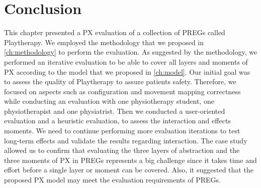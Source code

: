 \section{Conclusion}
This chapter presented a \ac{PX} evaluation of a collection of \acp{PREG} called Playtherapy. We employed the methodology that we proposed in \autoref{ch:methodology} to perform the evaluation. As suggested by the methodology, we performed an iterative evaluation to be able to cover all layers and moments of \ac{PX} according to the model that we proposed in \autoref{ch:model}. Our initial goal was to assess the quality of Playtherapy to assure patients safety. Therefore, we focused on aspects such as configuration and movement mapping correctness while conducting an evaluation with one physiotherapy student, one physiotherapist and one physiatrist. Then we conducted a user-oriented evaluation and a heuristic evaluation, to assess the interaction and effects moments. We need to continue performing more evaluation iterations to test long-term effects and validate the results regarding interaction. The case study allowed us to confirm that evaluating the three layers of abstraction and the three moments of \ac{PX} in \acp{PREG} represents a big challenge since it takes time and effort before a single layer or moment can be covered. Also, it suggested that the proposed \ac{PX} model may meet the evaluation requirements of \acp{PREG}.
